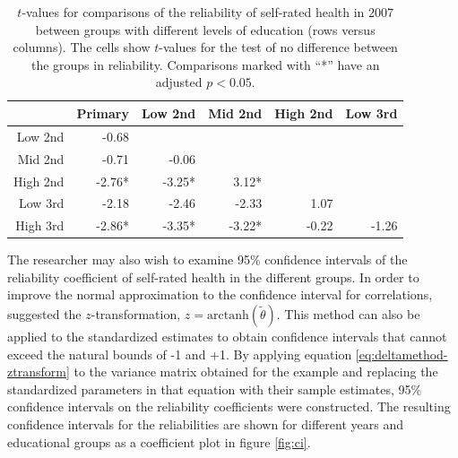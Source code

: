\documentclass[a4paper,11pt]{article}
\newcommand{\thetastan}{\tilde{\theta}}
\newcommand{\0}{\boldsymbol{0}}
\newcommand{\arctanh}{\mathrm{arctanh}}
\begin{document}
\fi
\begin{table}[b]
\begin{center}
\begin{tabular}{rrrrrr}
  \hline
 & Primary & Low 2nd & Mid 2nd & High 2nd & Low 3rd \\
   \hline
  Low 2nd & -0.68 \\ 
  Mid 2nd & -0.71 & -0.06  \\ 
  High 2nd & -2.76* & -3.25* &3.12*   \\ 
  Low 3rd & -2.18 & -2.46 & -2.33 & 1.07   \\ 
  High 3rd & -2.86* & -3.35* & -3.22* & -0.22 & -1.26  \\ 
   \hline
\end{tabular}\caption{$t$-values for comparisons of the reliability of self-rated health in 2007 
	 between groups with different levels of education (rows versus columns). 
	  The cells show $t$-values for the test of no difference
	 between the groups in reliability. Comparisons marked with ``*'' have an adjusted $p<0.05$.}
	 \label{tab:tests}
\end{center}
\end{table}

The  researcher may also wish to examine 95\% confidence intervals of the reliability coefficient of self-rated health in the different groups.
In order to improve the normal approximation to the confidence interval for correlations, \cite{fisher1925statistical} suggested the $z$-transformation, $z = \arctanh(\thetastan)$. This method can also be applied to the standardized estimates to obtain confidence 
intervals that cannot exceed the natural bounds of -1 and +1. By applying equation \ref{eq:deltamethod-ztransform} to the variance
matrix obtained for the example and replacing the standardized parameters in that equation with their sample estimates, 
95\% confidence intervals on the reliability coefficients were constructed. The resulting confidence
intervals for the reliabilities are shown for different years and educational groups as a coefficient plot in figure \ref{fig:ci}.
\end{document}
